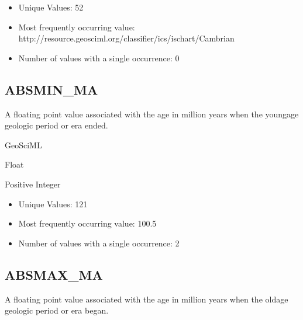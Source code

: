 \documentclass[letterpaper,10pt,english]{sphinxmanual}
\begin{document}


\begin{itemize}
\item {} 
Unique Values: 52

\item {} 
Most frequently occurring value: http://resource.geosciml.org/classifier/ics/ischart/Cambrian

\item {} 
Number of values with a single occurrence: 0

\end{itemize}


\subsection{ABSMIN\_MA}
\label{\detokenize{field_glossary:absmin-ma}}
A floating point value associated with the age in million years when the young\sphinxhyphen{}age geologic period or era ended.

GeoSciML

Float


Positive Integer

\begin{itemize}
\item {} 
Unique Values: 121

\item {} 
Most frequently occurring value: 100.5

\item {} 
Number of values with a single occurrence: 2

\end{itemize}


\subsection{ABSMAX\_MA}
\label{\detokenize{field_glossary:absmax-ma}}
A floating point value associated with the age in million years when the old\sphinxhyphen{}age geologic period or era began.
\end{document}
